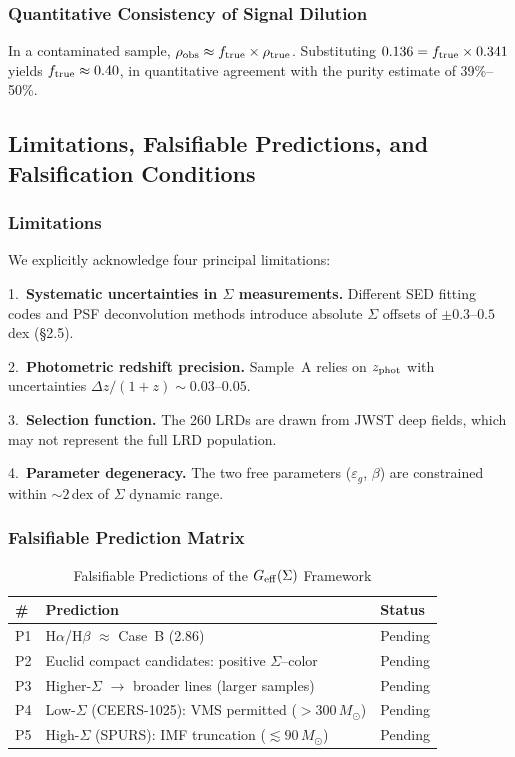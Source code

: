 \documentclass[apj,twocolumn,longbibliography,linenumbers]{aastex701}
\begin{document}
\subsubsection{Quantitative Consistency of Signal Dilution}

In a contaminated sample, $\rho_{\rm obs} \approx f_{\rm true} \times \rho_{\rm true}$. Substituting $0.136 = f_{\rm true} \times 0.341$ yields $f_{\rm true} \approx 0.40$, in quantitative agreement with the \citealt{Rinaldi2026} purity estimate of 39\%--50\%.

\subsection{Limitations, Falsifiable Predictions, and Falsification Conditions}

\subsubsection{Limitations}

We explicitly acknowledge four principal limitations:

1.~\textbf{Systematic uncertainties in $\Sigma$ measurements.} Different SED fitting codes and PSF deconvolution methods introduce absolute $\Sigma$ offsets of $\pm 0.3$--$0.5$\,dex (\S2.5).

2.~\textbf{Photometric redshift precision.} Sample~A relies on $z_{\rm phot}$ with uncertainties $\Delta z/(1+z) \sim 0.03$--$0.05$.

3.~\textbf{Selection function.} The 260 LRDs are drawn from JWST deep fields, which may not represent the full LRD population.

4.~\textbf{Parameter degeneracy.} The two free parameters ($\varepsilon_g$, $\beta$) are constrained within ${\sim}2$\,dex of $\Sigma$ dynamic range.

\subsubsection{Falsifiable Prediction Matrix}

\begin{table}[h]
\caption{Falsifiable Predictions of the $G_{\rm eff}(\Sigma)$ Framework}
\label{tab:predictions}
\centering
\scriptsize
\setlength{\tabcolsep}{3pt}
\begin{tabular}{@{}l l l@{}}
\hline
\# & Prediction & Status \\
\hline
P1 & H$\alpha$/H$\beta$ $\approx$ Case~B (2.86) & Pending \\
P2 & Euclid compact candidates: positive $\Sigma$--color & Pending \\
P3 & Higher-$\Sigma$ $\to$ broader lines (larger samples) & Pending \\
P4 & Low-$\Sigma$ (CEERS-1025): VMS permitted ($> 300\,M_\odot$) & Pending \\
P5 & High-$\Sigma$ (SPURS): IMF truncation ($\lesssim 90\,M_\odot$) & Pending \\
\hline
\end{tabular}
\end{table}
\end{document}
